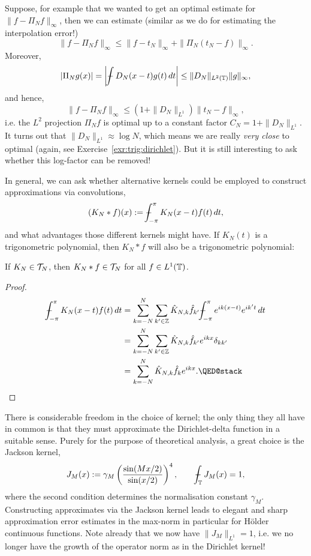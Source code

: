 Suppose, for example that we wanted to get an optimal estimate for $\| f - \Pi_N f \|_\infty$, then we can estimate (similar as we do for estimating the interpolation error!)
\[
  \| f - \Pi_N f \|_\infty
  \leq 
  \| f - t_N \|_\infty + \| \Pi_N (t_N - f) \|_\infty. 
\]
Moreover, 
\[
  | \Pi_N g(x) | = \bigg| \mint D_N(x - t) g(t) \,dt \bigg| 
    \leq \| D_N \|_{L^2(\TT)} \|g \|_\infty, 
\]
and hence, 
\[
  \| f - \Pi_N f \|_\infty \leq (1 + \|D_N\|_{L^1}) \| t_N - f \|_\infty,
\]
i.e. the $L^2$ projection $\Pi_N f$ is optimal up to a constant factor $C_N = 1 + \|D_N\|_{L^1}$. It turns out that $\|D_N\|_{L^1} \approx \log N$, which means we are really {\em very close} to optimal (again, see Exercise~\ref{exr:trig:dirichlet}). But it is still interesting to ask whether this log-factor can be removed!

In general, we can ask whether alternative kernels could be employed to construct approximations via convolutions, 
\[
    (K_N \ast f)(x) := \mint_{-\pi}^\pi K_N(x-t) f(t) \, dt,
\]
and what advantages those different kernels might have. 
If $K_N(t)$ is a trigonometric polynomial, then $K_N \ast f$ will also be a trigonometric polynomial:

\begin{lemma}
  If $K_N \in \mathcal{T}_N$, then $K_N \ast f \in \mathcal{T}_N$ for
  all $f \in L^1(\mathbb{T})$.
\end{lemma}
\begin{proof}
  \begin{align*}
    \mint_{-\pi}^\pi K_N(x-t) f(t) \,dt
    &=
    \sum_{k =  -N}^N \sum_{k' \in \Z}
        \hat{K}_{N,k} \hat{f}_{k'} \mint_{-\pi}^\pi e^{ik(x-t)} e^{ik't}\,dt
    \\ &=
    \sum_{k =  -N}^N \sum_{k' \in \Z}
       \hat{K}_{N,k} \hat{f}_{k'} e^{ikx} \delta_{kk'}
    \\ &=
    \sum_{k = -N}^N \hat{K}_{N,k} \hat{f}_{k} e^{ikx}. \qedhere
  \end{align*}
\end{proof}


There is considerable freedom in the choice of kernel; the only thing they all have in common is that they must approximate the Dirichlet-delta function in a suitable sense. Purely for the purpose of theoretical analysis, a great choice is the Jackson kernel,
\[
    J_M(x) := \gamma_M \left( \frac{\sin( Mx/2)}{\sin(x/2)} \right)^4,
    \qquad
    \mint_\TT J_M(x) = 1,
\]
where the second condition determines the normalisation constant $\gamma_M$.
Constructing approximates via the Jackson kernel leads to elegant and
sharp approximation error estimates in the max-norm in particular for H\"{o}lder continuous functions. Note already that we now have $\| J_M \|_{L^1} = 1$, i.e. we no longer have the growth of the operator norm as in the Dirichlet kernel!

